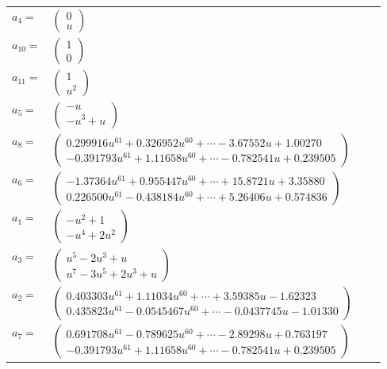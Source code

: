 \documentclass[1p]{elsarticle_modified}
\theoremstyle{definition}
\begin{document}
\begin{tabular}{m{7pt} m{180pt} m{7pt} m{180pt} }
\flushright $a_{4}=$&$\begin{pmatrix}0\\u\end{pmatrix}$ \\
\flushright $a_{10}=$&$\begin{pmatrix}1\\0\end{pmatrix}$ \\
\flushright $a_{11}=$&$\begin{pmatrix}1\\u^2\end{pmatrix}$ \\
\flushright $a_{5}=$&$\begin{pmatrix}- u\\- u^3+u\end{pmatrix}$ \\
\flushright $a_{8}=$&$\begin{pmatrix}0.299916 u^{61}+0.326952 u^{60}+\cdots-3.67552 u+1.00270\\-0.391793 u^{61}+1.11658 u^{60}+\cdots-0.782541 u+0.239505\end{pmatrix}$ \\
\flushright $a_{6}=$&$\begin{pmatrix}-1.37364 u^{61}+0.955447 u^{60}+\cdots+15.8721 u+3.35880\\0.226500 u^{61}-0.438184 u^{60}+\cdots+5.26406 u+0.574836\end{pmatrix}$ \\
\flushright $a_{1}=$&$\begin{pmatrix}- u^2+1\\- u^4+2 u^2\end{pmatrix}$ \\
\flushright $a_{3}=$&$\begin{pmatrix}u^5-2 u^3+u\\u^7-3 u^5+2 u^3+u\end{pmatrix}$ \\
\flushright $a_{2}=$&$\begin{pmatrix}0.403303 u^{61}+1.11034 u^{60}+\cdots+3.59385 u-1.62323\\0.435823 u^{61}-0.0545467 u^{60}+\cdots-0.0437745 u-1.01330\end{pmatrix}$ \\
\flushright $a_{7}=$&$\begin{pmatrix}0.691708 u^{61}-0.789625 u^{60}+\cdots-2.89298 u+0.763197\\-0.391793 u^{61}+1.11658 u^{60}+\cdots-0.782541 u+0.239505\end{pmatrix}$ \\

\end{tabular}
\end{document}
